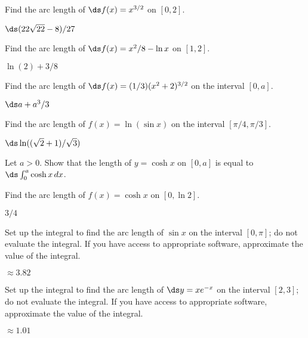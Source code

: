\begin{exercises}

\begin{exercise} Find the arc length of $\ds f(x)=x^{3/2}$ on $[0,2]$.
\begin{answer} $\ds (22\sqrt{22}-8)/27$
\end{answer}\end{exercise}

\begin{exercise} Find the arc length of $\ds f(x) = x^2/8-\ln x$
on $[1,2]$.
\begin{answer} $\ln(2)+3/8$
\end{answer}\end{exercise}

\begin{exercise}
Find the arc length of $\ds f(x) = (1/3)(x^2 +2)^{3/2}$
on the interval $[0,a]$.
\begin{answer} $\ds a+a^3/3$
\end{answer}\end{exercise}

\begin{exercise} Find the arc length of $f(x)=\ln(\sin x)$ on the
interval $[\pi/4,\pi/3]$.
\begin{answer} $\ds \ln((\sqrt2+1)/\sqrt3)$
\end{answer}\end{exercise}

\begin{exercise} Let $a>0$. Show that the length of $y=\cosh x$ on
$[0,a]$ is equal to $\ds \int _0 ^a \cosh x\,dx$.

\begin{exercise} Find the arc length of $f(x)=\cosh x$ on $[0, \ln 2]$.
\begin{answer} $3/4$
\end{answer}\end{exercise}

\begin{exercise} Set up the integral to find the arc length of $\sin x$ 
on the interval $[0,\pi]$; do not evaluate the integral. If you have
access to appropriate software, approximate the value of the integral.
\begin{answer} $\approx 3.82$
\end{answer}\end{exercise}

\begin{exercise} Set up the integral to find the arc length of $\ds y=xe^{-x}$
on the interval $[2,3]$; do not evaluate the integral. If you have
access to appropriate software, approximate the value of the integral.
\begin{answer} $\approx 1.01$
\end{answer}\end{exercise}


\end{exercise}
\end{exercises}
